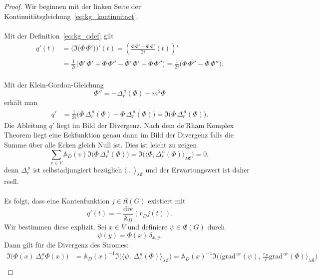 \documentclass[11pt,a4paper,leqno]{report}
\numberwithin{equation}{chapter}
\begin{document}
\begin{proof}
	Wir beginnen mit der linken Seite der Kontinuitätsgleichung~\eqref{eq:kg_kontinuitaet}. \\
	\\
	Mit der Definition~\eqref{eq:kg_qdef} gilt
	\begin{align*}
		q'(t)
		&= \bigl(\Im\!\bigl(\Phi\,\overline{\Phi'}\bigr))'(t) 
		= \!\left(
		\frac{\Phi\,\overline{\Phi}'-\overline{\Phi}\,\Phi'}{2i}(t)
		\right)' \\[4pt]
		&= \frac{1}{2i}
		\bigl(
		\Phi'\,\overline{\Phi}' + \Phi\,\overline{\Phi}'' 
		- \overline{\Phi}'\,\Phi' - \overline{\Phi}\,\Phi''
		\bigr)
		= \frac{1}{2i}
		\bigl(
		\Phi\,\overline{\Phi''} - \overline{\Phi}\,\Phi''
		\bigr).
	\end{align*}
	\\
	Mit der Klein-Gordon-Gleichung
	\[
	\Phi'' = -\Delta_r^{\,a}(\Phi) - m^2\Phi
	\]
	erhält man
	\begin{align*}
		q'
		&= \frac{1}{2i}
		\bigl(\overline{\Phi}\,\Delta_r^{\,a}(\Phi)-\Phi\,\overline{\Delta_r^{\,a}(\Phi)}\bigr)
		= \Im\!\bigl(\overline{\Phi}\,\Delta_r^{\,a}(\Phi)\bigr).\label{eq:ausdruck1}
	\end{align*}
	\noindent
	Die Ableitung \(q'\) liegt im Bild der Divergenz. Nach dem de'Rham Komplex Theorem liegt eine Eckfunktion genau dann im Bild der Divergenz falls die Summe über alle Ecken gleich Null ist. Dies ist leicht zu zeigen
	\[
	\sum_{v \in V} \mathbb{A}_D(v)\Im\!\bigl(\overline{\Phi}\,\Delta_r^{\,a}(\Phi)\bigr)
	= \Im\!\bigl(\langle \Phi, \Delta_r^{\,a}(\Phi) \rangle_{\lambda\mathfrak{E}}\bigr) = 0,
	\]	
	denn \(\Delta_r^{\,a}\) ist selbstadjungiert bezüglich $\langle.,.\rangle_{\lambda\mathfrak{E}}$ und der Erwartungswert ist daher reell.  \\
	\\
	Es folgt, dass eine Kantenfunktion \(j \in \mathfrak{K}(G)\) existiert mit
	\[
	q'(t) = -\,\frac{\mathrm{div}}{\mathbb{A}_D}(r_Dj(t)).
	\]
	Wir bestimmen diese explizit. Sei \(x \in V\) und definiere \(\psi \in \mathfrak{E}(G)\) durch
	\[
	\psi(y) = \Phi(x)\,\delta_{x,y}.
	\]
	Dann gilt für die Divergenz des Stromes:
	\begin{align*} 
		\Im\!\bigl(\overline{\Phi(x)}\,\Delta_r^{\,a} \Phi(x)\bigr)
		&= \mathbb{A}_D(x)^{-1}\Im\!\bigl(\langle \psi,\, \Delta_r^{\,a}(\Phi)\rangle_{\lambda\mathfrak{E}}\bigr)
		= \mathbb{A}_D(x)^{-1}\Im\!\bigl(\langle \mathrm{grad}^{\,ar}(\psi),\, 
		\tfrac{r_D}{r}\mathrm{grad}^{\,ar}(\Phi) \rangle_{\lambda\mathfrak{K}}\bigr) \\[4pt]

\end{align*}
\end{proof}
\end{document}
